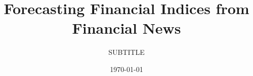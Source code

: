 \documentclass[nofilelist]{cslthse-msc}
\title{Forecasting Financial Indices from Financial News}
\subtitle{SUBTITLE}
\date{\today}
\begin{document}
\renewcommand{\bibname}{References}

\makefrontmatter






{} %

\begin{appendices}




\printfilelist

\checkoddpage
\ifoddpage
\else
   \newpage
   \thispagestyle{empty}
   \mbox{ }
\fi
%
\end{appendices}
\end{document}
